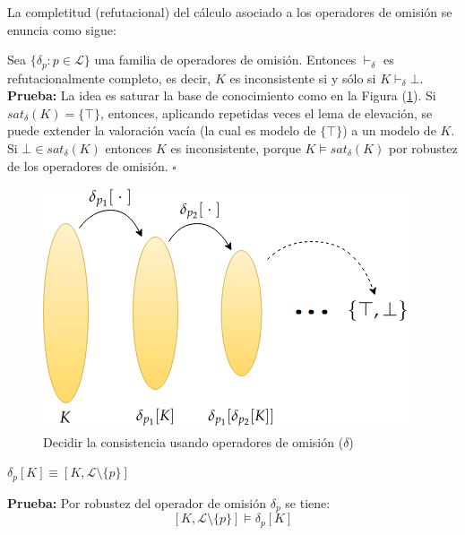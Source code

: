 La completitud (refutacional) del cálculo asociado a los operadores de omisión se enuncia como sigue:

\thm \label{teo:completo} Sea $\{ \delta_p : p \in \mathcal{L} \}$ una familia de operadores de omisión. Entonces $\vdash_{\delta}$ es refutacionalmente completo, es decir, $K$ es inconsistente si y sólo si $K \vdash_{\delta} \bot$.\\

\noindent \textbf{Prueba:} La idea es saturar la base de conocimiento como en la Figura (\ref{fig:comple}). Si $sat_{\delta} (K) = \{ \top \}$, entonces, aplicando repetidas veces el lema de elevación, se puede extender la valoración vacía (la cual es modelo de $\{ \top \}$) a un modelo de $K$.\\
Si $\bot \in sat_{\delta} (K)$ entonces $K$ es inconsistente, porque $K \vDash sat_{\delta} (K)$ por robustez de los operadores de omisión. $\square$ %

\vspace{0.5cm}
\begin{figure}[h]
	\centering
		\includegraphics[scale=0.8]{imagenes/comple.png}
	\caption{Decidir la consistencia usando operadores de omisión ($\delta$)}
	\label{fig:comple}
\end{figure}
\vspace{0.5cm}

\cor \label{cor:omitep} $\delta_p [K] \equiv [K, \mathcal{L} \setminus \{ p \}]$

\noindent \textbf{Prueba:} Por robustez del operador de omisión $\delta_p$ se tiene:
$$[K, \mathcal{L} \setminus \{ p \}] \vDash \delta_p [K]$$


